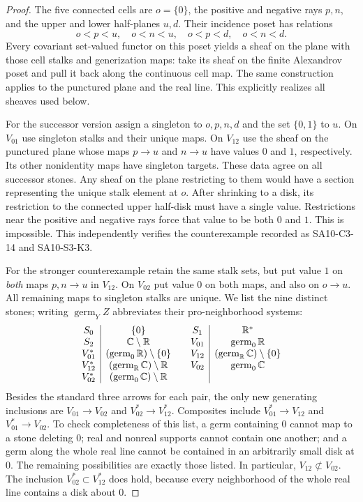 \begin{proof}
The five connected cells are $o=\{0\}$, the positive and negative rays
$p,n$, and the upper and lower half-planes $u,d$. Their incidence poset
has relations
\[
 o<p<u,\quad o<n<u,\quad o<p<d,\quad o<n<d.
\]
Every covariant set-valued functor on this poset yields a sheaf on the
plane with those cell stalks and generization maps: take its sheaf on the
finite Alexandrov poset and pull it back along the continuous cell map.
The same construction applies to the punctured plane and the real line.
This explicitly realizes all sheaves used below.

For the successor version assign a singleton to $o,p,n,d$ and the set
$\{0,1\}$ to $u$. On $V_{01}$ use singleton stalks and their unique maps.
On $V_{12}$ use the sheaf on the punctured plane whose maps $p\to u$ and
$n\to u$ have values $0$ and $1$, respectively. Its other nonidentity
maps have singleton targets. These data agree on all successor stones.
Any sheaf on the plane restricting to them would have a section
representing the unique stalk element at $o$. After shrinking to a disk,
its restriction to the connected upper half-disk must have a single value.
Restrictions near the positive and negative rays force that value to be
both $0$ and $1$. This is impossible. This independently verifies the
counterexample recorded as SA10-C3-14 and SA10-S3-K3.

For the stronger counterexample retain the same stalk sets, but put value
$1$ on \emph{both} maps $p,n\to u$ in $V_{12}$. On $V_{02}$ put value
$0$ on both maps, and also on $o\to u$. All remaining maps to singleton
stalks are unique. We list the nine distinct stones; writing
$\operatorname{germ}_Y Z$ abbreviates their pro-neighborhood systems:
\[
\begin{array}{c|c@{\qquad}c|c}
S_0&\{0\}&S_1&\mathbb R^*\\
S_2&\mathbb C\setminus\mathbb R&V_{01}&\operatorname{germ}_0\mathbb R\\
V_{01}^*&(\operatorname{germ}_0\mathbb R)\setminus\{0\}
&V_{12}&(\operatorname{germ}_{\mathbb R}\mathbb C)\setminus\{0\}\\
V_{12}^*&(\operatorname{germ}_{\mathbb R}\mathbb C)\setminus\mathbb R
&V_{02}&\operatorname{germ}_0\mathbb C\\
V_{02}^*&(\operatorname{germ}_0\mathbb C)\setminus\mathbb R&&
\end{array}
\]
Besides the standard three arrows for each pair, the only new generating
inclusions are $V_{01}\to V_{02}$ and
$V_{02}^*\to V_{12}^*$. Composites include
$V_{01}^*\to V_{12}$ and $V_{01}^*\to V_{02}$. To check completeness of
this list, a germ containing $0$ cannot map to a stone deleting $0$;
real and nonreal supports cannot contain one another; and a germ along
the whole real line cannot be contained in an arbitrarily small disk at
$0$. The remaining possibilities are exactly those listed. In particular,
$V_{12}\not\subset V_{02}$. The inclusion
$V_{02}^*\subset V_{12}^*$ does hold, because every neighborhood of the
whole real line contains a disk about $0$.


\end{proof}
